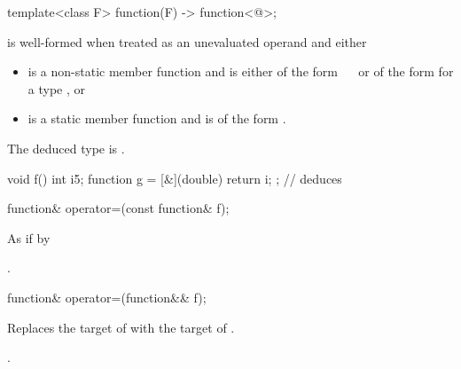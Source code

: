 \begin{itemdecl}
template<class F> function(F) -> function<@\seebelow@>;
\end{itemdecl}

\begin{itemdescr}
\pnum
\constraints
{} is well-formed when treated as an unevaluated operand and either
\begin{itemize}
\item
{} is a non-static member function and
 is either of the form
~\cv{}~
or of the form
for a type , or
\item
{} is a static member function and
 is of the form
.
\end{itemize}

\pnum
\remarks
The deduced type is .

\pnum
\begin{example}
\begin{codeblock}
void f() {
  int i{5};
  function g = [&](double) { return i; };       // deduces 
}
\end{codeblock}
\end{example}
\end{itemdescr}

%
\begin{itemdecl}
function& operator=(const function& f);
\end{itemdecl}

\begin{itemdescr}
\pnum
\effects
As if by 

\pnum
\returns
{}.
\end{itemdescr}

%
\begin{itemdecl}
function& operator=(function&& f);
\end{itemdecl}

\begin{itemdescr}
\pnum
\effects
Replaces the target of 
with the target of .

\pnum
\returns
{}.
\end{itemdescr}

